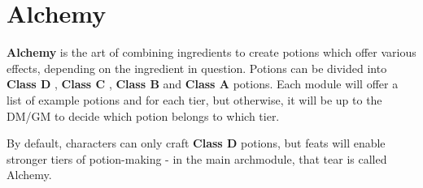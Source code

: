 \section{Alchemy}
\textbf{Alchemy} is the art of combining ingredients to create potions which offer various effects, depending on the ingredient in question. Potions can be divided into \textbf{Class D} , \textbf{Class C} , \textbf{Class B}  and \textbf{Class A}  potions. Each module will offer a list of example potions and for each tier, but otherwise, it will be up to the DM/GM to decide which  potion belongs to which tier.

By default, characters can only craft \textbf{Class D} potions, but feats will enable stronger tiers of potion-making - in the main archmodule, that tear is called Alchemy.
